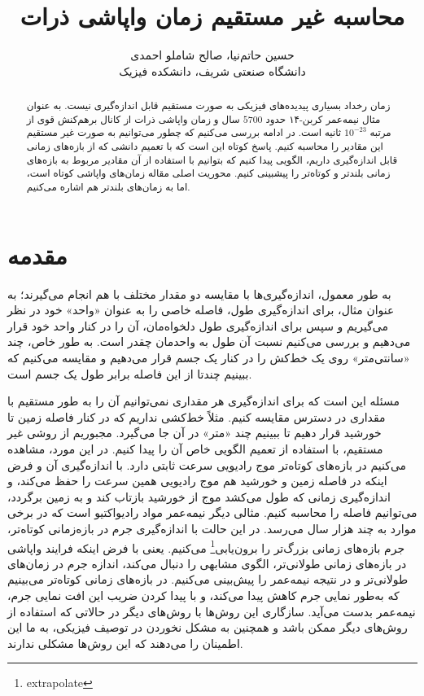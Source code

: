 \documentclass[12pt,a4paper]{article}
\title{محاسبه غیر مستقیم زمان واپاشی ذرات}
\author{حسین حاتم‌نیا، صالح شاملو احمدی\\دانشگاه صنعتی شریف، دانشکده فیزیک}
\begin{document}
	\maketitle
	\begin{abstract}
		زمان رخداد بسیاری پیدیده‌های فیزیکی به صورت مستقیم قابل اندازه‌گیری نیست. به عنوان مثال نیمه‌عمر کربن-۱۴ حدود $5700$ سال و زمان واپاشی ذرات
		از کانال برهم‌کنش قوی از مرتبه $10^{-23}$ ثانیه است. در ادامه بررسی می‌کنیم که چطور می‌توانیم به صورت غیر مستقیم این مقادیر را محاسبه کنیم.
		پاسخ کوتاه این است که با تعمیم دانشی که از بازه‌های زمانی قابل اندازه‌گیری داریم، الگویی پیدا کنیم که بتوانیم با استفاده از آن مقادیر مربوط
		به بازه‌های زمانی بلندتر و کوتاه‌تر را پیشبینی کنیم. محوریت اصلی مقاله زمان‌های واپاشی کوتاه است، اما به زمان‌های بلندتر هم اشاره می‌کنیم.
	\end{abstract}
	\section{مقدمه}
	به طور معمول، اندازه‌گیری‌ها با مقایسه دو مقدار مختلف با هم انجام می‌گیرند؛ به عنوان مثال، برای اندازه‌گیری طول، فاصله خاصی را به عنوان «واحد» خود در نظر
	می‌گیریم و سپس برای اندازه‌گیری طول دلخواه‌مان، آن را در کنار واحد خود قرار می‌دهیم و بررسی می‌کنیم نسبت آن طول به واحدمان چقدر است. به طور خاص، چند
	«سانتی‌متر» روی یک خط‌کش را در کنار یک جسم قرار می‌دهیم و مقایسه می‌کنیم که ببینیم چندتا از این فاصله برابر طول یک جسم است.
	
	مسئله این است که برای اندازه‌گیری هر مقداری نمی‌توانیم آن را به طور مستقیم با مقداری در دسترس مقایسه کنیم. مثلاً خط‌کشی نداریم که در کنار فاصله زمین تا
	خورشید قرار دهیم تا ببینیم چند «متر» در آن جا می‌گیرد. مجبوریم از روشی غیر مستقیم، با استفاده از تعمیم الگویی خاص آن را پیدا کنیم. در این مورد، مشاهده
	می‌کنیم در بازه‌های کوتاه‌تر موج رادیویی سرعت ثابتی دارد. با اندازه‌گیری آن و فرض اینکه در فاصله زمین و خورشید هم موج رادیویی همین سرعت را حفظ می‌کند، و
	اندازه‌گیری زمانی که طول می‌کشد موج از خورشید بازتاب کند و به زمین برگردد، می‌توانیم فاصله را محاسبه کنیم. مثالی دیگر نیمه‌عمر مواد رادیواکتیو است که
	در برخی موارد به چند هزار سال می‌رسد. در این حالت با اندازه‌گیری جرم در بازه‌زمانی کوتاه‌تر، جرم بازه‌های زمانی بزرگ‌تر را برون‌یابی\footnote{extrapolate}
	می‌کنیم. یعنی با فرض اینکه فرایند واپاشی در بازه‌های زمانی طولانی‌تر، الگوی مشابهی را دنبال می‌کند، اندازه جرم در زمان‌های طولانی‌تر و در نتیجه نیمه‌عمر را
	پیش‌بینی می‌کنیم. در بازه‌های زمانی کوتاه‌تر می‌بینیم که به‌طور نمایی جرم کاهش پیدا می‌کند، و با پیدا کردن ضریب این افت نمایی جرم، نیمه‌عمر بدست می‌آید.
	سازگاری این روش‌ها با روش‌های دیگر در حالاتی که استفاده از روش‌های دیگر ممکن باشد و همچنین به مشکل نخوردن در توصیف فیزیکی، به ما این اطمینان را می‌دهند
	که این روش‌ها مشکلی ندارند. 
	
\end{document}
